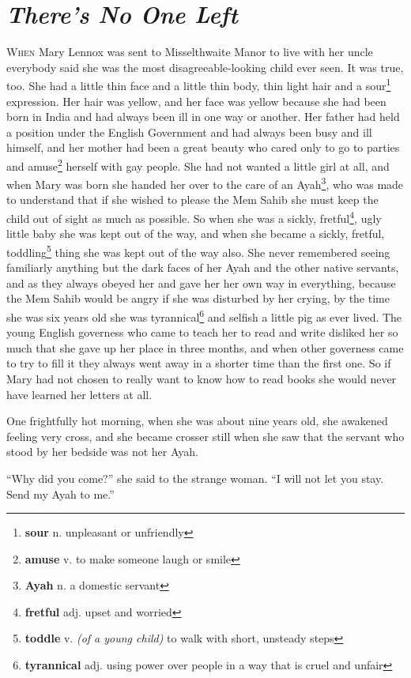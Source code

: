 \chapter{\textit{There's No One Left}}
\lettrine{W}{hen} Mary Lennox was sent to Misselthwaite Manor to live with her uncle everybody said she was the most disagreeable-looking child ever seen. It was true, too. She had a little thin face and a little thin body, thin light hair and a sour\footnote{\textbf{sour} n. unpleasant or unfriendly} expression. Her hair was yellow, and her face was yellow because she had been born in India and had always been ill in one way or another. Her father had held a position under the English Government and had always been busy and ill himself, and her mother had been a great beauty who cared only to go to parties and amuse\footnote{\textbf{amuse} v. to make someone laugh or smile} herself with gay people. She had not wanted a little girl at all, and when Mary was born she handed her over to the care of an Ayah\footnote{\textbf{Ayah} n. a domestic servant}, who was made to understand that if she wished to please the Mem Sahib she must keep the child out of sight as much as possible. So when she was a sickly, fretful\footnote{\textbf{fretful} adj. upset and worried}, ugly little baby she was kept out of the way, and when she became a sickly, fretful, toddling\footnote{\textbf{toddle} v. \textit{(of a young child)} to walk with short, unsteady steps} thing she was kept out of the way also. She never remembered seeing familiarly anything but the dark faces of her Ayah and the other native servants, and as they always obeyed her and gave her her own way in everything, because the Mem Sahib would be angry if she was disturbed by her crying, by the time she was six years old she was tyrannical\footnote{\textbf{tyrannical} adj. using power over people in a way that is cruel and unfair} and selfish a little pig as ever lived. The young English governess who came to teach her to read and write disliked her so much that she gave up her place in three months, and when other governess came to try to fill it they always went away in a shorter time than the first one. So if Mary had not chosen to really want to know how to read books she would never have learned her letters at all.

One frightfully hot morning, when she was about nine years old, she awakened feeling very cross, and she became crosser still when she saw that the servant who stood by her bedside was not her Ayah.

``Why did you come?'' she said to the strange woman. ``I will not let you stay. Send my Ayah to me.''

